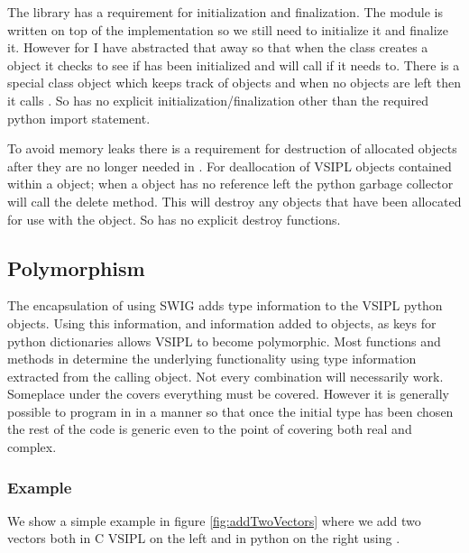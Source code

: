 The  library has a requirement for initialization and finalization.  The  module is written on top of the \cvl{} implementation so we still need to initialize it and finalize it. However for \pyjv{} I have abstracted that away so that when the class creates a \cvl{} object it checks to see if \cvl{} has been initialized and will call  if it needs to. There is a special class object which keeps track of \pyjv{} objects and when no  objects are left then it calls . So \pyjv{} has no explicit initialization/finalization other than the required python import statement.  

To avoid memory leaks there is a requirement for destruction of allocated objects after they are no longer needed in \cvl{}. For deallocation of VSIPL objects contained within a \pyjv{} object; when a \pyjv{} object has no reference left the python garbage collector will call the delete method.  This will destroy any \cvl{} objects that have been allocated for use with the \pyjv{} object. So \pyjv{} has no explicit destroy functions.
%
\subsection*{Polymorphism}
The encapsulation of \cvl{} using SWIG adds type information to the VSIPL python objects. Using this information, and information added to \pyjv{} objects, as keys for python dictionaries allows VSIPL to become polymorphic. Most functions and methods in \pyjv{} determine the underlying functionality using type information extracted from the calling object. Not every combination will necessarily work.  Someplace under the covers everything must be covered.  However it is generally possible to program in \pyjv{} in a manner so that once the initial type has been chosen the rest of the code is generic even to the point of covering both real and complex.
%
\subsubsection*{Example}
We show a simple example in figure \ref{fig:addTwoVectors} where we add two vectors both in C VSIPL on the left and in python on the right using \pyjv.
% 
